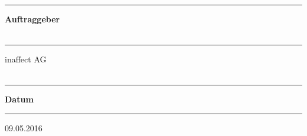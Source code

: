 \begin{titlepage}
\begin{minipage}[b]{0.91\textwidth}
	\begin{minipage}[b]{0.27\textwidth}
	\hrule\vskip 0.5cm
		\textbf{Auftraggeber}\\
		\\
	\end{minipage}
	\begin{minipage}[b]{0.03\textwidth}
	\hskip 0.5cm
	\end{minipage}
	\begin{minipage}[b]{0.7\textwidth}
	\hrule\vskip 0.5cm
		inaffect AG\\
		\\
	\end{minipage}
	
	
	\begin{minipage}[b]{0.27\textwidth}
	\hrule\vskip 0.5cm
		\textbf{Datum}
	\end{minipage}
	\begin{minipage}[b]{0.03\textwidth}
	\hskip 0.5cm
	\end{minipage}
	\begin{minipage}[b]{0.7\textwidth}
	\hrule\vskip 0.5cm
		09.05.2016
	\end{minipage}
\end{minipage}
\vskip 0.5cm



\end{titlepage}

